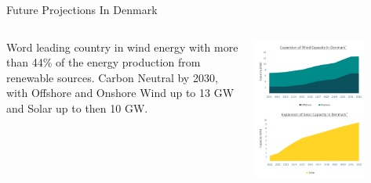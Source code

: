 \documentclass[aspectratio=169,hyperref={pdfpagelabels=false}]{beamer}
\begin{document}
\begin{frame}{\Large{Future Projections In Denmark}}

        \begin{columns}
          \begin{column}{0.4\textwidth}
            Word leading country in wind energy with more than 44\% of the energy production from renewable sources.
            Carbon Neutral by 2030, with Offshore and Onshore Wind up to 13 GW and Solar up to then 10 GW.
            
          \end{column}
      
          \begin{column}{0.5\textwidth}
            \includegraphics[width=0.75\textwidth]{img/pic2.png} %
          \end{column}
        \end{columns}
        \let\thefootnote\relax{}
      \end{frame}
\end{document}
